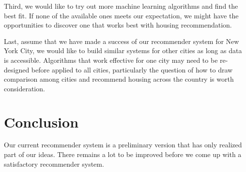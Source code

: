 \documentclass[letterpaper,twocolumn,10pt]{article}
\begin{document}
Third,  we would like to try out more machine learning algorithms and find the best fit. If none of the available ones meets our expectation, we might have the opportunities to discover  one that works best with housing recommendation.

Last, assume that we have made a  success of our recommender system for New York City, we would like to build similar systems for other cities as long as data is accessible.   Algorithms that work effective for one city may need to be re-designed before applied to all cities, particularly the question of how to draw comparison among cities and recommend housing across the country  is worth consideration.  
 



\section{Conclusion}
Our current recommender system is a preliminary version that has only realized part of our ideas. There remains a lot to be improved before we come up with a satisfactory recommender system.

\end{document}

